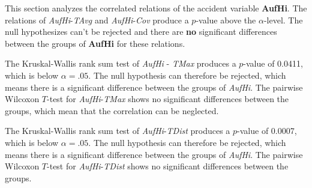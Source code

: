 This section analyzes the correlated relations of the accident variable \textbf{AufHi}. The relations of \textit{AufHi}-\textit{TAvg} and \textit{AufHi}-\textit{Cov} produce a $p$-value above the $\alpha$-level. The null hypothesizes can't be rejected and there are \textbf{no} significant differences between the groups of \textbf{AufHi} for these relations.



The Kruskal-Wallis rank sum test of \textit{AufHi} - \textit{TMax} produces a $p$-value of 0.0411, which is below $\alpha=.05$. The null hypothesis can therefore be rejected, which means there is a significant difference between the groups of \textit{AufHi}. The pairwise Wilcoxon $T$-test for \textit{AufHi}-\textit{TMax} shows no significant differences between the groups, which mean that the correlation can be neglected.

The Kruskal-Wallis rank sum test of \textit{AufHi}-\textit{TDist} produces a $p$-value of 0.0007, which is below $\alpha=.05$. The null hypothesis can therefore be rejected, which means there is a significant difference between the groups of \textit{AufHi}. The pairwise Wilcoxon $T$-test for \textit{AufHi}-\textit{TDist} shows no significant differences between the groups.


